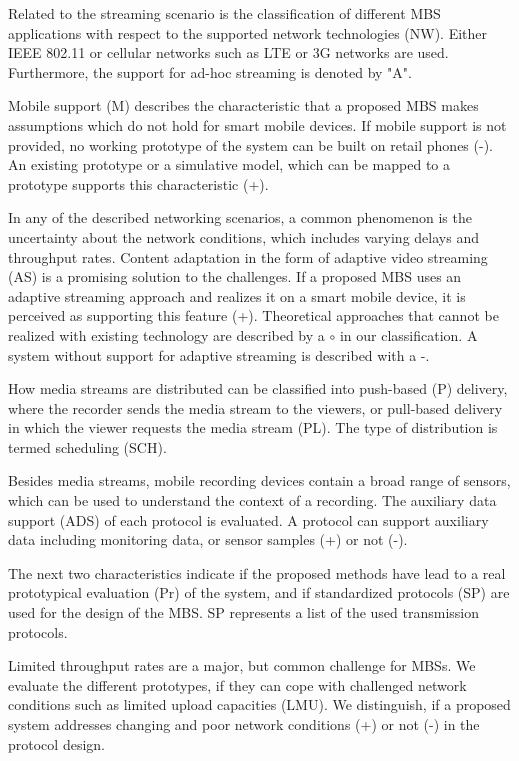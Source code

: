 Related to the streaming scenario is the classification of different \ac{MBS} applications with respect to the supported network technologies (NW). Either IEEE 802.11 or cellular networks such as \ac{LTE} or \ac{3G} networks are used. 
Furthermore, the support for ad-hoc streaming is denoted by "A". 

Mobile support (M) describes the characteristic that a proposed \ac{MBS} makes assumptions which do not hold for smart mobile devices.
If mobile support is not provided, no working prototype of the system can be built on retail phones (-).
An existing prototype or a simulative model, which can be mapped to a prototype supports this characteristic (+).

In any of the described networking scenarios, a common phenomenon is the uncertainty about the network conditions, which includes varying delays and throughput rates.
Content adaptation in the form of adaptive video streaming (AS) is a promising solution to the challenges.
If a proposed \ac{MBS} uses an adaptive streaming approach and realizes it on a smart mobile device, it is perceived as supporting this feature (+).
Theoretical approaches that cannot be realized with existing technology are described by a $\circ$ in our classification.
A system without support for adaptive streaming is described with a -.

How media streams are distributed can be classified into push-based (P) delivery, where the recorder sends the media stream to the viewers,
or pull-based delivery in which the viewer requests the media stream (PL).
The type of distribution is termed scheduling (SCH).

Besides media streams, mobile recording devices contain a broad range of sensors, which can be used to understand the context of a recording. The auxiliary data support (ADS) of each protocol is evaluated.
A protocol can support auxiliary data including monitoring data, or sensor samples (+) or not (-).

The next two characteristics indicate if the proposed methods have lead to a real prototypical evaluation (Pr) of the system, and if standardized protocols 
(SP) are used for the design of the \ac{MBS}.
SP represents a list of the used transmission protocols.

Limited throughput rates are a major, but common challenge for \ac{MBS}s.
We evaluate the different prototypes, if they can cope with challenged network conditions such as limited upload capacities (LMU).
We distinguish, if a proposed system addresses changing and poor network conditions (+) or not (-) in the protocol design.

